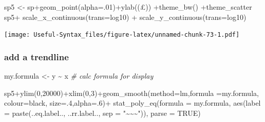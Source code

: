 \documentclass[
]{article}
\newenvironment{Shaded}{\begin{snugshade}}{\end{snugshade}}
\newcommand{\AttributeTok}[1]{\textcolor[rgb]{0.77,0.63,0.00}{#1}}
\newcommand{\CommentTok}[1]{\textcolor[rgb]{0.56,0.35,0.01}{\textit{#1}}}
\newcommand{\ConstantTok}[1]{\textcolor[rgb]{0.00,0.00,0.00}{#1}}
\newcommand{\DecValTok}[1]{\textcolor[rgb]{0.00,0.00,0.81}{#1}}
\newcommand{\FunctionTok}[1]{\textcolor[rgb]{0.00,0.00,0.00}{#1}}
\newcommand{\NormalTok}[1]{#1}
\newcommand{\OtherTok}[1]{\textcolor[rgb]{0.56,0.35,0.01}{#1}}
\newcommand{\SpecialCharTok}[1]{\textcolor[rgb]{0.00,0.00,0.00}{#1}}
\newcommand{\StringTok}[1]{\textcolor[rgb]{0.31,0.60,0.02}{#1}}
\begin{document}
\begin{Shaded}
\begin{Highlighting}[]
\NormalTok{sp5 }\OtherTok{\textless{}{-}}\NormalTok{ sp}\SpecialCharTok{+}\FunctionTok{geom\_point}\NormalTok{(}\AttributeTok{alpha=}\NormalTok{.}\DecValTok{01}\NormalTok{)}\SpecialCharTok{+}\FunctionTok{ylab}\NormalTok{(}\StringTok{\textquotesingle{}(£)\textquotesingle{}}\NormalTok{) }\SpecialCharTok{+}\FunctionTok{theme\_bw}\NormalTok{() }\SpecialCharTok{+}\NormalTok{theme\_scatter}
\NormalTok{sp5}\SpecialCharTok{+} \FunctionTok{scale\_x\_continuous}\NormalTok{(}\AttributeTok{trans=}\StringTok{\textquotesingle{}log10\textquotesingle{}}\NormalTok{) }\SpecialCharTok{+}
  \FunctionTok{scale\_y\_continuous}\NormalTok{(}\AttributeTok{trans=}\StringTok{\textquotesingle{}log10\textquotesingle{}}\NormalTok{)}
\end{Highlighting}
\end{Shaded}

\texttt{[image: Useful-Syntax\_files/figure-latex/unnamed-chunk-73-1.pdf]}

\hypertarget{add-a-trendline}{%
\subsubsection{add a trendline}\label{add-a-trendline}}

\begin{Shaded}
\begin{Highlighting}[]
\NormalTok{my.formula }\OtherTok{\textless{}{-}}\NormalTok{ y }\SpecialCharTok{\textasciitilde{}}\NormalTok{ x }\CommentTok{\# calc formula for display}

\NormalTok{sp5}\SpecialCharTok{+}\FunctionTok{ylim}\NormalTok{(}\DecValTok{0}\NormalTok{,}\DecValTok{20000}\NormalTok{)}\SpecialCharTok{+}\FunctionTok{xlim}\NormalTok{(}\DecValTok{0}\NormalTok{,}\DecValTok{3}\NormalTok{)}\SpecialCharTok{+}\FunctionTok{geom\_smooth}\NormalTok{(}\AttributeTok{method=}\StringTok{\textquotesingle{}lm\textquotesingle{}}\NormalTok{,}\AttributeTok{formula =}\NormalTok{my.formula,}
                                        \AttributeTok{colour=}\StringTok{\textquotesingle{}black\textquotesingle{}}\NormalTok{, }\AttributeTok{size=}\NormalTok{.}\DecValTok{4}\NormalTok{,}\AttributeTok{alpha=}\NormalTok{.}\DecValTok{6}\NormalTok{)}\SpecialCharTok{+}
  \FunctionTok{stat\_poly\_eq}\NormalTok{(}\AttributeTok{formula =}\NormalTok{ my.formula,}
               \FunctionTok{aes}\NormalTok{(}\AttributeTok{label =} \FunctionTok{paste}\NormalTok{(..eq.label.., ..rr.label..,}
                                                        \AttributeTok{sep =} \StringTok{"\textasciitilde{}\textasciitilde{}\textasciitilde{}"}\NormalTok{)), }\AttributeTok{parse =} \ConstantTok{TRUE}\NormalTok{)}
\end{Highlighting}
\end{Shaded}
\end{document}
